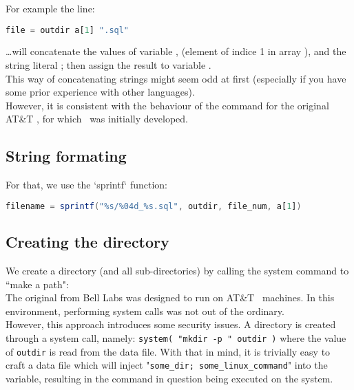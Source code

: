 For example the line:
\begin{lstlisting}[language=awk]
file = outdir a[1] ".sql"
\end{lstlisting}

\dots will concatenate the values of variable ,  (element of indice 1 in array ), and the string literal ; then assign the result to variable . \\

This way of concatenating strings might seem odd at first (especially if you have some prior experience with other languages). \\

However, it is consistent with the behaviour of the  command for the original AT\&T \Unix, for which \awk\ was initially developed.


\subsection*{String formating}

For that, we use the `sprintf` function:
\begin{lstlisting}[language=awk]
filename = sprintf("%s/%04d_%s.sql", outdir, file_num, a[1])
\end{lstlisting}




\subsection*{Creating the directory}

We create a directory (and all sub-directories) by calling the system command to ``make a path":  \\

The original  from Bell Labs was designed to run on AT\&T \Unix\ machines. In this environment, performing system calls was not out of the ordinary. \\

However, this approach introduces some security issues. A directory is created through a system call, namely: \texttt{system( "mkdir -p " outdir )} where the value of \texttt{outdir} is read from the data file. With that in mind, it is trivially easy to craft a data file which will inject "\texttt{some\_dir; some\_linux\_command}" into the  variable, resulting in the command in question being executed on the system. \\

